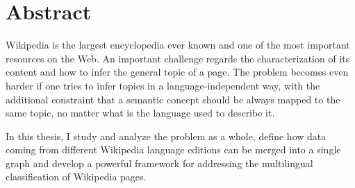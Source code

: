 \chapter*{Abstract}
    Wikipedia is the largest encyclopedia ever known and one of the most important resources on the Web. An important challenge regards the characterization of its content and how to infer the general topic of a page. The problem becomes even harder if one tries to infer topics in a language-independent way, with the additional constraint that a semantic concept should be always mapped to the same topic, no matter what is the language used to describe it.
    
    In this thesis, I study and analyze the problem as a whole, define how data coming from different Wikipedia language editions can be merged into a single graph and develop a powerful framework for addressing the multilingual classification of Wikipedia pages.
